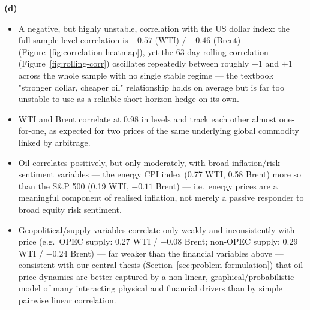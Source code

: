 \textbf{(d)} 
\begin{itemize}
	\item  A
	negative, but highly unstable, correlation with the US dollar index: the full-sample level correlation is $-0.57$ (WTI) / $-0.46$ (Brent) (Figure~\ref{fig:correlation-heatmap}), yet the 63-day rolling correlation (Figure~\ref{fig:rolling-corr}) oscillates repeatedly between roughly $-1$
	and $+1$ across the whole sample with no single stable regime — the textbook "stronger dollar, cheaper oil" relationship holds on average but is far too unstable to use as a reliable short-horizon hedge on its own.
	\item WTI and Brent correlate at 0.98 in levels and track each other almost one-for-one, as expected for two prices of the same underlying global commodity linked by arbitrage.
	\item Oil correlates positively, but only
	moderately, with broad inflation/risk-sentiment variables — the energy CPI
	index (0.77 WTI, 0.58 Brent) more so than the S\&P 500 (0.19 WTI, $-0.11$
	Brent) — i.e.\ energy prices are a meaningful component of realised
	inflation, not merely a passive responder to broad equity risk sentiment.
	\item Geopolitical/supply variables correlate only weakly and inconsistently
	with price (e.g.\ OPEC supply: 0.27 WTI / $-0.08$ Brent; non-OPEC supply:
	0.29 WTI / $-0.24$ Brent) — far weaker than the financial variables above —
	consistent with our central thesis (Section~\ref{sec:problem-formulation})
	that oil-price dynamics are better captured by a non-linear, graphical/probabilistic model of many interacting physical and financial drivers than by simple pairwise linear correlation.
\end{itemize}